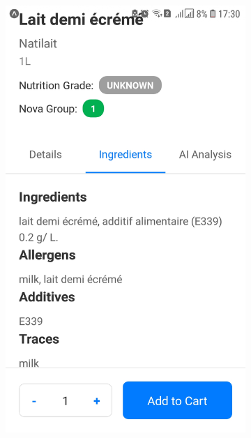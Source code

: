 \begin{figure}[h!]
\begin{subfigure}[b]{0.23\textwidth}
        \includegraphics[width=\textwidth]{images/natilait3.jpg}
    \end{subfigure}
    \begin{subfigure}[b]{0.23\textwidth}
        \centering

\end{subfigure}
\end{figure}

